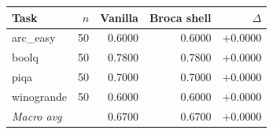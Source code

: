 \begin{tabular}{lrrrr}
\toprule
Task & $n$ & Vanilla & Broca shell & $\Delta$ \\
\midrule
arc\_easy & 50 & 0.6000 & 0.6000 & +0.0000 \\
boolq & 50 & 0.7800 & 0.7800 & +0.0000 \\
piqa & 50 & 0.7000 & 0.7000 & +0.0000 \\
winogrande & 50 & 0.6000 & 0.6000 & +0.0000 \\
\midrule
\textit{Macro avg} & & 0.6700 & 0.6700 & +0.0000 \\
\bottomrule
\end{tabular}

